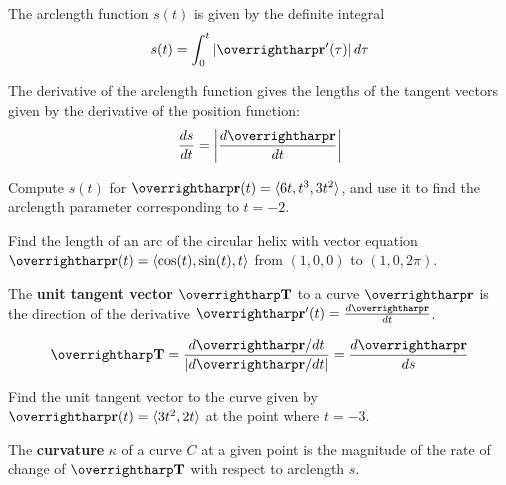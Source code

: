 \documentclass[letterpaper, twoside, 12pt]{book}
\begin{document}
\begin{theorem}
The arclength function $s(t)$ is given by the definite integral
\[
  s(t)
    =
  \int_0^t |\vect{r}'(\tau)| \dvar{\tau}
\]
\end{theorem}

\begin{theorem}
The derivative of the arclength function gives the lengths of
the tangent vectors given by the derivative of the position function:
\[
  \frac{ds}{dt} = \left|\frac{d\vect{r}}{dt}\right|
\]
\end{theorem}

          \begin{problem}
            Compute $s(t)$ for $\vect{r}(t)=\<6t, t^3, 3t^2\>$,
            and use it to find the arclength parameter corresponding
            to $t=-2$.
          \end{problem}

          \begin{solution}

          \end{solution}

          \begin{problem}
            Find the length of an arc of the circular helix with
            vector equation
            $\vect{r}(t) = \<\cos(t),\sin(t),t\>$
            from $(1,0,0)$ to $(1,0,2\pi)$.
          \end{problem}

\begin{definition}
  The \textbf{unit tangent vector} $\vect{T}$ to a curve $\vect{r}$ is the
  direction of the derivative $\vect{r}'(t)=\frac{d\vect{r}}{dt}$.
\end{definition}

\begin{theorem}
  \[
    \vect{T} = \frac{d\vect{r}/dt}{|d\vect{r}/dt|} = \frac{d\vect{r}}{ds}
  \]
\end{theorem}

          \begin{problem}
            Find the unit tangent vector to the curve given by
            $\vect{r}(t)=\<3t^2,2t\>$ at the point where $t=-3$.
          \end{problem}

          \begin{solution}

          \end{solution}

\begin{definition}
  The \textbf{curvature} $\kappa$ of a curve $C$ at a given point is
  the magnitude of the rate of change of $\vect{T}$ with respect to
  arclength $s$.
\end{definition}
\end{document}
